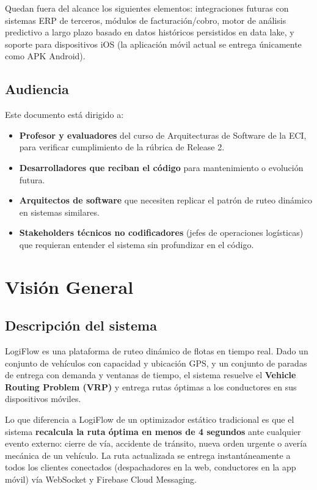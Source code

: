 \documentclass[12pt,a4paper,oneside]{article}
\begin{document}
Quedan fuera del alcance los siguientes elementos: integraciones futuras con sistemas ERP de terceros, m\'odulos de facturaci\'on/cobro, motor de an\'alisis predictivo a largo plazo basado en datos hist\'oricos persistidos en data lake, y soporte para dispositivos iOS (la aplicaci\'on m\'ovil actual se entrega \'unicamente como APK Android).

\subsection{Audiencia}
Este documento est\'a dirigido a:
\begin{itemize}[leftmargin=*]
  \item \textbf{Profesor y evaluadores} del curso de Arquitecturas de Software de la ECI, para verificar cumplimiento de la r\'ubrica de Release 2.
  \item \textbf{Desarrolladores que reciban el c\'odigo} para mantenimiento o evoluci\'on futura.
  \item \textbf{Arquitectos de software} que necesiten replicar el patr\'on de ruteo din\'amico en sistemas similares.
  \item \textbf{Stakeholders t\'ecnicos no codificadores} (jefes de operaciones log\'isticas) que requieran entender el sistema sin profundizar en el c\'odigo.
\end{itemize}

\section{Visi\'on General}

\subsection{Descripci\'on del sistema}
LogiFlow es una plataforma de ruteo din\'amico de flotas en tiempo real. Dado un conjunto de veh\'iculos con capacidad y ubicaci\'on GPS, y un conjunto de paradas de entrega con demanda y ventanas de tiempo, el sistema resuelve el \textbf{Vehicle Routing Problem (VRP)} y entrega rutas \'optimas a los conductores en sus dispositivos m\'oviles.

Lo que diferencia a LogiFlow de un optimizador est\'atico tradicional es que el sistema \textbf{recalcula la ruta \'optima en menos de 4 segundos} ante cualquier evento externo: cierre de v\'ia, accidente de tr\'ansito, nueva orden urgente o aver\'ia mec\'anica de un veh\'iculo. La ruta actualizada se entrega instant\'aneamente a todos los clientes conectados (despachadores en la web, conductores en la app m\'ovil) v\'ia WebSocket y Firebase Cloud Messaging.
\end{document}
